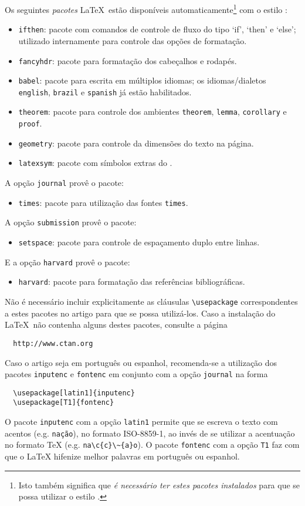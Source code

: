 \documentclass[conference,harvard,brazil,english]{sbatex}
\begin{document}
Os seguintes \emph{pacotes} \LaTeX\ estão disponíveis
automaticamente\footnote{Isto também significa que \emph{é necessário
ter estes pacotes instalados} para que se possa utilizar o estilo
\SBATeX.} com o estilo \SBATeX:
\begin{itemize}
\item \verb+ifthen+: pacote com comandos de controle de fluxo do tipo
`if', `then' e `else'; utilizado internamente para controle das opções de
formatação.
\item \verb+fancyhdr+: pacote para formatação dos cabeçalhos e rodapés.
\item \verb+babel+: pacote para escrita em múltiplos idiomas; os
idiomas/dialetos \verb+english+, \verb+brazil+ e \verb+spanish+ já
estão habilitados.
\item \verb+theorem+: pacote para controle dos ambientes \verb+theorem+,
\verb+lemma+, \verb+corollary+ e \verb+proof+.
\item \verb+geometry+: pacote para controle da dimensões do texto na página.
\item \verb+latexsym+: pacote com símbolos extras do \LaTeXe.
\end{itemize}
A opção \verb+journal+ provê o pacote:
\begin{itemize}
\item \verb+times+: pacote para utilização das fontes \verb+times+.
\end{itemize}
A opção \verb+submission+ provê o pacote:
\begin{itemize}
\item \verb+setspace+: pacote para controle de espaçamento duplo entre
linhas.
\end{itemize}
E a opção \verb+harvard+ provê o pacote:
\begin{itemize}
\item \verb+harvard+: pacote para formatação das referências
bibliográficas.
\end{itemize}

Não é necessário incluir explicitamente as cláusulas
\verb+\usepackage+ correspondentes a estes pacotes no artigo para que
se possa utilizá-los. Caso a instalação do \LaTeX\ não contenha alguns
destes pacotes, consulte a página
\begin{verbatim}
  http://www.ctan.org
\end{verbatim}

Caso o artigo seja em português ou espanhol, recomenda-se a utilização
dos pacotes \verb+inputenc+ e \verb+fontenc+ em conjunto com a opção
\verb+journal+ na forma
\begin{verbatim}
  \usepackage[latin1]{inputenc}
  \usepackage[T1]{fontenc}
\end{verbatim}
O pacote \verb+inputenc+ com a opção \verb+latin1+ permite que se
escreva o texto com acentos (e.g. \verb+nação+), no formato
ISO-8859-1, ao invés de se utilizar a acentuação no formato \TeX
(e.g. \verb+na\c{c}\~{a}o+). O pacote \verb+fontenc+ com a opção
\verb+T1+ faz com que o LaTeX hifenize melhor palavras em português ou
espanhol.
\end{document}
